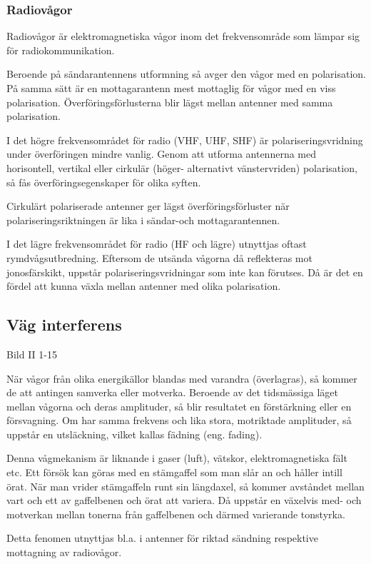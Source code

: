 \subsubsection{Radiovågor}
Radiovågor är elektromagnetiska vågor inom
det frekvensområde som lämpar sig för radiokommunikation.

Beroende på sändarantennens utformning så avger den vågor med en polarisation. På samma
sätt är en mottagarantenn mest mottaglig för vågor med en viss polarisation.
Överföringsförlusterna blir lägst mellan antenner med samma polarisation.

I det högre frekvensområdet för radio (VHF, UHF, SHF) är polariseringsvridning under
överföringen mindre vanlig. Genom att utforma antennerna med horisontell, vertikal eller
cirkulär (höger- alternativt vänstervriden) polarisation, så fås överföringsegenskaper för
olika syften.

Cirkulärt polariserade antenner ger lägst överföringsförluster när polariseringsriktningen
är lika i sändar-och mottagarantennen.

I det lägre frekvensområdet för radio (HF och lägre) utnyttjas oftast rymdvågsutbredning.
Eftersom de utsända vågorna då reflekteras mot jonosfärskikt, uppstår
polariseringsvridningar som inte kan förutses. Då är det en fördel att kunna växla mellan
antenner med olika polarisation.

\subsection{Väg interferens}

Bild II 1-15

När vågor från olika energikällor blandas med varandra (överlagras), så kommer de att
antingen samverka eller motverka. Beroende av det tidsmässiga läget mellan vågorna och
deras amplituder, så blir resultatet en förstärkning eller en försvagning. Om har samma
frekvens och lika stora, motriktade amplituder, så uppstår en utsläckning, vilket kallas
fädning (eng. fading).

Denna vågmekanism är liknande i gaser (luft), vätskor, elektromagnetiska fält etc. Ett
försök kan göras med en stämgaffel som man slår an och håller intill örat. När man
vrider stämgaffeln runt sin längdaxel, så kommer avståndet mellan vart och ett av
gaffelbenen och örat att variera. Då uppstår en växelvis med- och motverkan mellan tonerna
från gaffelbenen och därmed varierande tonstyrka.

Detta fenomen utnyttjas bl.a. i antenner för riktad sändning respektive mottagning av
radiovågor.

